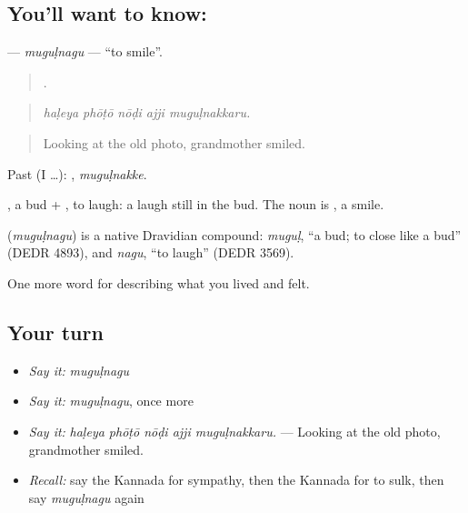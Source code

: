 \subsection*{You'll want to know: }
\textbf{} — \emph{muguḷnagu} — \textquotedblleft{}to smile\textquotedblright{}.

\begin{quote}
    .
\end{quote}

\begin{quote}
\emph{haḷeya phōṭō nōḍi ajji muguḷnakkaru.}
\end{quote}

\begin{quote}
Looking at the old photo, grandmother smiled.
\end{quote}

Past (I …): , \emph{muguḷnakke}.

, a bud + , to laugh: a laugh still in the bud. The noun is , a smile.

\begin{cousinweb}
\textbf{} (\emph{muguḷnagu}) is a native Dravidian compound: \emph{muguḷ}, \textquotedblleft{}a bud; to close like a bud\textquotedblright{} (DEDR 4893), and \emph{nagu}, \textquotedblleft{}to laugh\textquotedblright{} (DEDR 3569).
\end{cousinweb}

\begin{grammarlens}[title={What you've built}]
One more word for describing what you lived and felt.
\end{grammarlens}

\subsection*{Your turn}
\begin{itemize}
\raggedright
  \item \emph{Say it:} \emph{muguḷnagu}
  \item \emph{Say it:} \emph{muguḷnagu}, once more
  \item \emph{Say it:} \emph{haḷeya phōṭō nōḍi ajji muguḷnakkaru.} — Looking at the old photo, grandmother smiled.
  \item \emph{Recall:} say the Kannada for sympathy, then the Kannada for to sulk, then say \emph{muguḷnagu} again
\end{itemize}


